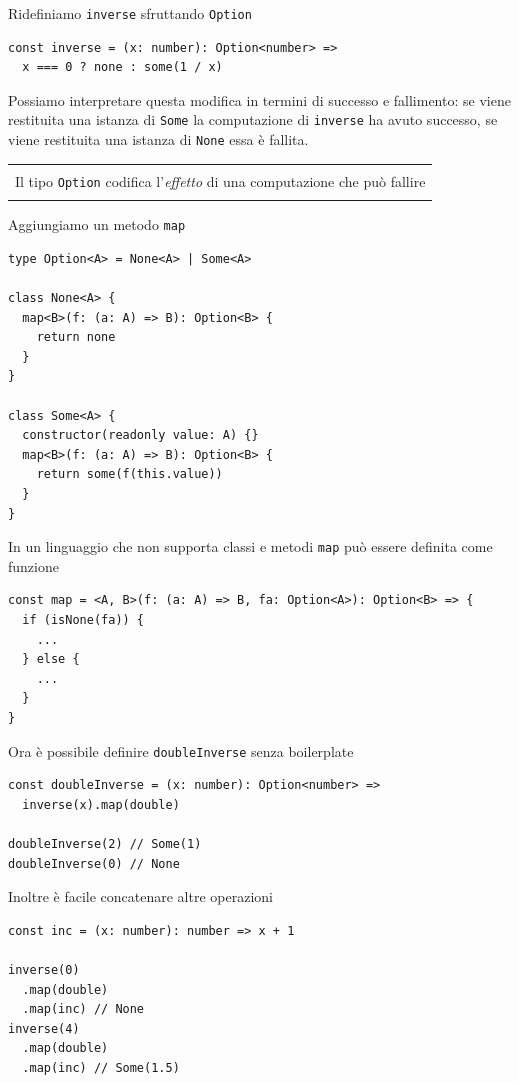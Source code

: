 \documentclass[12pt]{article}
\newenvironment{boxed}
    {\begin{center}
    \begin{tabular}{|p{0.9\textwidth}|}
    \hline\\
    }
    {
    \\\\\hline
    \end{tabular}
    \end{center}
    }
\begin{document}
Ridefiniamo \texttt{inverse} sfruttando \texttt{Option}

\begin{verbatim}
const inverse = (x: number): Option<number> =>
  x === 0 ? none : some(1 / x)
\end{verbatim}

Possiamo interpretare questa modifica in termini di successo e fallimento: se viene restituita una istanza di \texttt{Some}
la computazione di \texttt{inverse} ha avuto successo, se viene restituita una istanza di \texttt{None} essa è fallita.

\begin{boxed}
Il tipo \texttt{Option} codifica l'\emph{effetto} di una computazione che può fallire
\end{boxed}

Aggiungiamo un metodo \texttt{map}

\begin{verbatim}
type Option<A> = None<A> | Some<A>

class None<A> {
  map<B>(f: (a: A) => B): Option<B> {
    return none
  }
}

class Some<A> {
  constructor(readonly value: A) {}
  map<B>(f: (a: A) => B): Option<B> {
    return some(f(this.value))
  }
}
\end{verbatim}

In un linguaggio che non supporta classi e metodi \texttt{map} può essere definita come funzione

\begin{verbatim}
const map = <A, B>(f: (a: A) => B, fa: Option<A>): Option<B> => {
  if (isNone(fa)) {
    ...
  } else {
    ...
  }
}
\end{verbatim}


Ora è possibile definire \texttt{doubleInverse} senza boilerplate

\begin{verbatim}
const doubleInverse = (x: number): Option<number> =>
  inverse(x).map(double)

doubleInverse(2) // Some(1)
doubleInverse(0) // None
\end{verbatim}

Inoltre è facile concatenare altre operazioni

\begin{verbatim}
const inc = (x: number): number => x + 1

inverse(0)
  .map(double)
  .map(inc) // None
inverse(4)
  .map(double)
  .map(inc) // Some(1.5)
\end{verbatim}
\end{document}
